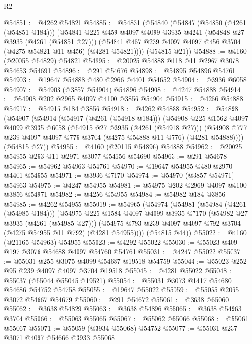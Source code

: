 \begin{lexlean}{R2}
\begin{coremodule}
@54851 := @4262 @54821
@54885 := @54831
    (@54840
      (@54847
        (@54850 (@4261 (@54851 @184)))
        (@54841
          @225
          @459
          @4097
          @4099
          @3935
          @4241
          (@54848 @27 @3935 (@4261 (@54851 @27)))
          (@54841 @457 @239 @4097 @4097 @456 @3704 (@4275 @54821 @11 @456) (@4281 @54821))))
      (@54815 @21))
@54888 := @4160 (@20055 @54829) @54821
@54895 := @20025 @54888 @118 @11 @2967 @3078 @54653 @54691
@54896 := @291 @54676
@54898 := @54895 @54896 @54761
@54903 := @19647 @54888 @480 @2966 @4401 @54652
@54904 := @3936 @6058
@54907 := @54903 (@3857 @54904) @54896
@54908 := @4247 @54888
@54914 := @54908 @202 @2965 @4097 @4100 @3856 @54904
@54915 := @4256 @54888
@54917 := @54915 @184 @3856
@54918 := @4262 @54888
@54952 := @54898
    (@54907
      (@54914
        (@54917 (@4261 (@54918 @184)))
        (@54908
          @225
          @1562
          @4097
          @4099
          @3935
          @6058
          (@54915 @27 @3935 (@4261 (@54918 @27)))
          (@54908 @777 @239 @4097 @4097 @776 @3704 (@4275 @54888 @11 @776) (@4281 @54888))))
      (@54815 @27))
@54955 := @4160 (@20115 @54896) @54888
@54962 := @20025 @54955 @263 @11 @2971 @3077 @54656 @54690
@54963 := @291 @54678
@54965 := @54962 @54963 @54761
@54970 := @19647 @54955 @480 @2970 @4401 @54655
@54971 := @3936 @7170
@54974 := @54970 (@3857 @54971) @54963
@54975 := @4247 @54955
@54981 := @54975 @202 @2969 @4097 @4100 @3856 @54971
@54982 := @4256 @54955
@54984 := @54982 @184 @3856
@54985 := @4262 @54955
@55019 := @54965
    (@54974
      (@54981
        (@54984 (@4261 (@54985 @184)))
        (@54975
          @225
          @1584
          @4097
          @4099
          @3935
          @7170
          (@54982 @27 @3935 (@4261 (@54985 @27)))
          (@54975 @793 @239 @4097 @4097 @792 @3704 (@4275 @54955 @11 @792) (@4281 @54955))))
      (@54815 @44))
@55022 := @4160 (@21165 @54963) @54955
@55023 := @4292 @55022
@55030 := @55023 @409 @197 @3076 @54688 @4097 @54760 @54761
@55031 := @4247 @55022
@55037 := @55031 @255 @3075 @4099 @54687 @19518 @54759
@55044 := @55023 @252 @95 @239 @4097 @4097 @3704 @19518
@55045 := @4281 @55022
@55048 := @55037 (@55044 @55045 @19521)
@55054 := @55031 @3073 @1417 @54680 @54686 @54752 @54758
@55055 := @19647 @55022
@55059 := @55055 @2065 @3072 @54667 @54679
@55060 := @291 @54672
@55061 := @3638 @55060
@55062 := @3638 @54829
@55063 := @3638 @54896
@55065 := @3638 @54963 @3704
@55066 := @55063 @55065
@55067 := @55062 @55066
@55068 := @55061 @55067
@55071 := @55059 (@3934 @55068) @54752
@55077 := @55031 @237 @3071 @4097 @54666 @3933 @55068

\end{coremodule}
\end{lexlean}
